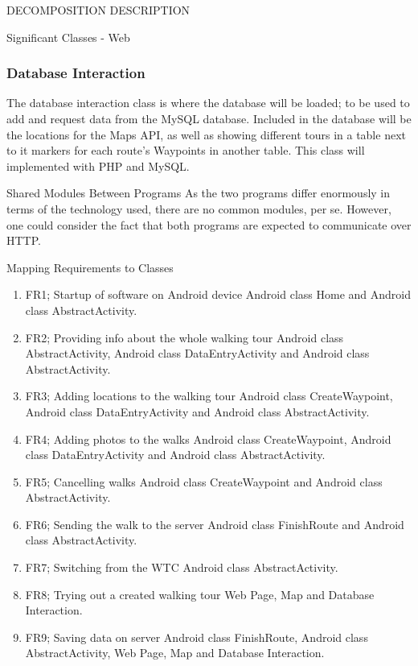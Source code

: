 \documentclass{article}
\begin{document}
\begin{section}{DECOMPOSITION DESCRIPTION}
\begin{subsection}{Significant Classes - Web}
		    \subsubsection{Database Interaction}
		    The database interaction class is where the database will be loaded; to be used to add and request data from the MySQL database. Included in the database will be the locations for the Maps API, as well as showing different tours in a table next to it markers for each route's Waypoints in another table. This class will implemented with PHP and MySQL.
	    \end{subsection}

    
    \begin{subsection}{Shared Modules Between Programs}
        As the two programs differ enormously in terms of the technology used, there are no common modules, per se. However, one could consider the fact that both programs are expected to communicate over HTTP.
    \end{subsection}


	\clearpage
	\begin{subsection}{Mapping Requirements to Classes}
        \begin{enumerate}
		    \item{FR1; Startup of software on Android device}
		    Android class Home and Android class AbstractActivity.

		    \item{FR2; Providing info about the whole walking tour}
		    Android class AbstractActivity, Android class DataEntryActivity
		    and Android class AbstractActivity.

		    \item{FR3; Adding locations to the walking tour}
		    Android class CreateWaypoint, Android class DataEntryActivity
		    and Android class AbstractActivity.

		    \item{FR4; Adding photos to the walks}
		    Android class CreateWaypoint, Android class DataEntryActivity 
		    and Android class AbstractActivity.

		    \item{FR5; Cancelling walks}
		    Android class CreateWaypoint and Android class AbstractActivity.

		    \item{FR6; Sending the walk to the server}
		    Android class FinishRoute and Android class AbstractActivity.

		    \item{FR7; Switching from the WTC}
		    Android class AbstractActivity.

		    \item{FR8; Trying out a created walking tour}
		    Web Page, Map and Database Interaction.

		    \item{FR9; Saving data on server}
		    Android class FinishRoute, Android class AbstractActivity, Web Page, Map and Database Interaction.
        \end{enumerate}
	\end{subsection}
\end{section}
\end{document}
